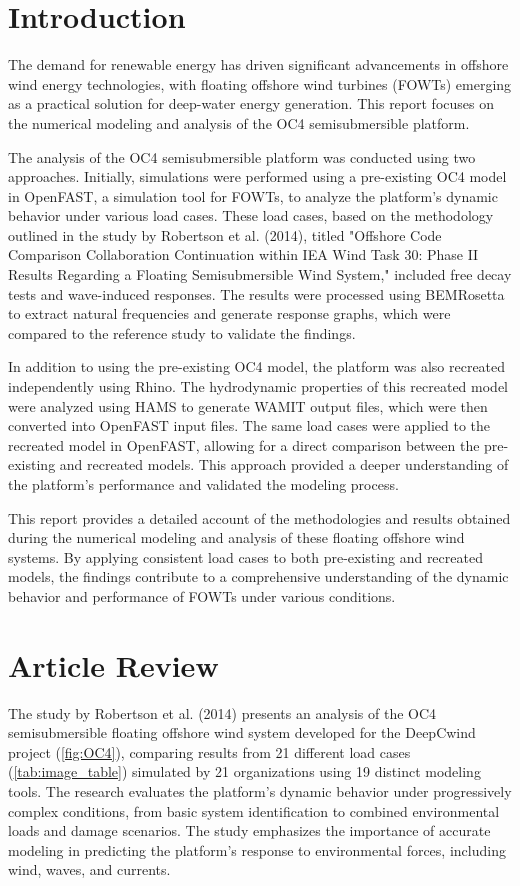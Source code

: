 \documentclass[a4paper, 11pt]{article}
\begin{document}
\section{Introduction}

\hspace*{0.5cm}The demand for renewable energy has driven significant advancements in offshore wind energy technologies, with floating offshore wind turbines (FOWTs) emerging as a practical solution for deep-water energy generation. This report focuses on the numerical modeling and analysis of the OC4 semisubmersible platform. 

The analysis of the OC4 semisubmersible platform was conducted using two approaches. Initially, simulations were performed using a pre-existing OC4 model in OpenFAST, a simulation tool for FOWTs, to analyze the platform's dynamic behavior under various load cases. These load cases, based on the methodology outlined in the study by Robertson et al. (2014), titled "Offshore Code Comparison Collaboration Continuation within IEA Wind Task 30: Phase II Results Regarding a Floating Semisubmersible Wind System," included free decay tests and wave-induced responses. The results were processed using BEMRosetta to extract natural frequencies and generate response graphs, which were compared to the reference study to validate the findings.

In addition to using the pre-existing OC4 model, the platform was also recreated independently using Rhino. The hydrodynamic properties of this recreated model were analyzed using HAMS to generate WAMIT output files, which were then converted into OpenFAST input files. The same load cases were applied to the recreated model in OpenFAST, allowing for a direct comparison between the pre-existing and recreated models. This approach provided a deeper understanding of the platform's performance and validated the modeling process.

This report provides a detailed account of the methodologies and results obtained during the numerical modeling and analysis of these floating offshore wind systems. By applying consistent load cases to both pre-existing and recreated models, the findings contribute to a comprehensive understanding of the dynamic behavior and performance of FOWTs under various conditions.

\section{Article Review}
\hspace*{0.5cm}The study by Robertson et al. (2014) presents an analysis of the OC4 semisubmersible floating offshore wind system developed for the DeepCwind project (\autoref{fig:OC4}), comparing results from 21 different load cases (\autoref{tab:image_table}) simulated by 21 organizations using 19 distinct modeling tools. The research evaluates the platform’s dynamic behavior under progressively complex conditions, from basic system identification to combined environmental loads and damage scenarios. The study emphasizes the importance of accurate modeling in predicting the platform's response to environmental forces, including wind, waves, and currents. 
\end{document}

